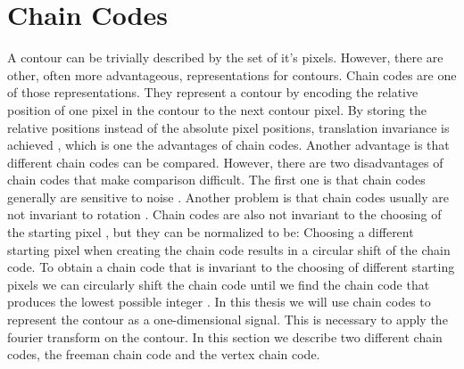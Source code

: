 \documentclass[thesis.tex]{subfiles}
\begin{document}
\section{Chain Codes} \label{chain_codes}
A contour can be trivially described by the set of it's pixels. However, there are other, often more advantageous, representations for contours. Chain codes are one of those representations. They represent a contour by encoding the relative position of one pixel in the contour to the next contour pixel. By storing the relative positions instead of the absolute pixel positions, translation invariance is achieved \cite{yang2008su}, which is one the advantages of chain codes. Another advantage is that different chain codes can be compared. However, there are two disadvantages of chain codes that make comparison difficult. The first one is that chain codes generally are sensitive to noise \cite{yang2008su}. Another problem is that chain codes usually are not invariant to rotation \cite{yang2008su}. Chain codes are also not invariant to the choosing of the starting pixel \cite{Ballard:1982:CV:578131}, but they can be normalized to be: Choosing a different starting pixel when creating the chain code results in a circular shift of the chain code. To obtain a chain code that is invariant to the choosing of different starting pixels we can circularly shift the chain code until we find the chain code that produces the lowest possible integer \cite{Ballard:1982:CV:578131}. In this thesis we will use chain codes to represent the contour as a one-dimensional signal. This is necessary to apply the fourier transform on the contour. In this section we describe two different chain codes, the freeman chain code and the vertex chain code.    
\end{document}
